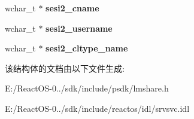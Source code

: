 \begin{DoxyCompactItemize}
wchar\+\_\+t $\ast$ {\bfseries sesi2\+\_\+cname}
\item 
\mbox{\label{struct___s_e_s_s_i_o_n___i_n_f_o__2_aac3dc89980b28ae5172096bde27c83cb}} 
wchar\+\_\+t $\ast$ {\bfseries sesi2\+\_\+username}
\item 
\mbox{\label{struct___s_e_s_s_i_o_n___i_n_f_o__2_a6379e09ee2bbaf2ce44f9e9b83c45a3c}} 
wchar\+\_\+t $\ast$ {\bfseries sesi2\+\_\+cltype\+\_\+name}
\end{DoxyCompactItemize}


该结构体的文档由以下文件生成\+:\begin{DoxyCompactItemize}
\item 
E\+:/\+React\+O\+S-\/0../sdk/include/psdk/lmshare.\+h\item 
E\+:/\+React\+O\+S-\/0../sdk/include/reactos/idl/srvsvc.\+idl\end{DoxyCompactItemize}
